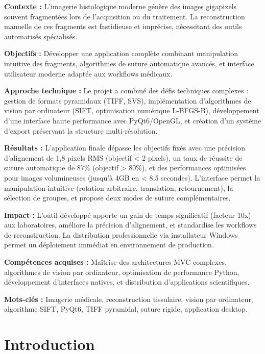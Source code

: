 \documentclass[12pt,a4paper]{report}
\begin{document}
\textbf{Contexte :} L'imagerie histologique moderne génère des images gigapixels souvent fragmentées lors de l'acquisition ou du traitement. La reconstruction manuelle de ces fragments est fastidieuse et imprécise, nécessitant des outils automatisés spécialisés.

\textbf{Objectifs :} Développer une application complète combinant manipulation intuitive des fragments, algorithmes de suture automatique avancés, et interface utilisateur moderne adaptée aux workflows médicaux.

\textbf{Approche technique :} Le projet a combiné des défis techniques complexes : gestion de formats pyramidaux (TIFF, SVS), implémentation d'algorithmes de vision par ordinateur (SIFT, optimisation numérique L-BFGS-B), développement d'une interface haute performance avec PyQt6/OpenGL, et création d'un système d'export préservant la structure multi-résolution.

\textbf{Résultats :} L'application finale dépasse les objectifs fixés avec une précision d'alignement de 1,8 pixels RMS (objectif < 2 pixels), un taux de réussite de suture automatique de 87\% (objectif > 80\%), et des performances optimisées pour images volumineuses (jusqu'à 4GB en < 8,5 secondes). L'interface permet la manipulation intuitive (rotation arbitraire, translation, retournement), la sélection de groupes, et propose deux modes de suture complémentaires.

\textbf{Impact :} L'outil développé apporte un gain de temps significatif (facteur 10x) aux laboratoires, améliore la précision d'alignement, et standardise les workflows de reconstruction. La distribution professionnelle via installateur Windows permet un déploiement immédiat en environnement de production.

\textbf{Compétences acquises :} Maîtrise des architectures MVC complexes, algorithmes de vision par ordinateur, optimisation de performance Python, développement d'interfaces natives, et distribution d'applications scientifiques.

\textbf{Mots-clés :} Imagerie médicale, reconstruction tissulaire, vision par ordinateur, algorithme SIFT, PyQt6, TIFF pyramidal, suture rigide, application desktop.

\newpage
\tableofcontents

\newpage
\listoffigures

\newpage
\listoftables

\newpage
\chapter{Introduction}
\end{document}
